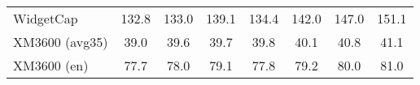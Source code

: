 \begin{tabular}{lccccccc}
WidgetCap & \phantom{-}132.8 & \phantom{-}133.0 & \phantom{-}139.1 & \phantom{-}134.4 & \phantom{-}142.0 & \phantom{-}147.0 & \phantom{-}151.1 \\
XM3600 (avg35) & \phantom{-}\phantom{0}39.0 & \phantom{-}\phantom{0}39.6 & \phantom{-}\phantom{0}39.7 & \phantom{-}\phantom{0}39.8 & \phantom{-}\phantom{0}40.1 & \phantom{-}\phantom{0}40.8 & \phantom{-}\phantom{0}41.1 \\
XM3600 (en) & \phantom{-}\phantom{0}77.7 & \phantom{-}\phantom{0}78.0 & \phantom{-}\phantom{0}79.1 & \phantom{-}\phantom{0}77.8 & \phantom{-}\phantom{0}79.2 & \phantom{-}\phantom{0}80.0 & \phantom{-}\phantom{0}81.0 \\
\bottomrule
\end{tabular}
